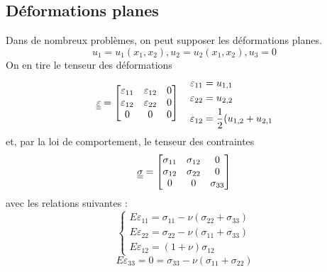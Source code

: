 \subsection{Déformations planes}\label{ssec:Ch08-1.1}
Dans de nombreux problèmes, on peut supposer les déformations planes.
\begin{equation}
    u_1=u_1(x_1,x_2), u_2=u_2(x_1,x_2), u_3=0
    \label{eq:Ch08-001}
\end{equation}
On en tire le tenseur des déformations 
\begin{equation}
    \underline{\underline{\varepsilon}}=
    \begin{bmatrix}
        \varepsilon_{11} & \varepsilon_{12} & 0 \\
        \varepsilon_{12} & \varepsilon_{22} & 0 \\
        0                & 0                & 0 \\     
    \end{bmatrix}
    \quad
    \begin{aligned}
         \varepsilon_{11}&= u_{1,1} \\
         \varepsilon_{22}&= u_{2,2} \\
         \varepsilon_{12}&= \frac{1}{2}(u_{1,2}+u_{2,1} 
    \end{aligned}
\label{eq:Ch08-002}
\end{equation}
et, par la loi de comportement, le tenseur des contraintes
\begin{equation}
    \underline{\underline{\sigma}} =
    \begin{bmatrix}
        \sigma_{11} & \sigma_{12} & 0           \\
        \sigma_{12} & \sigma_{22} & 0           \\
        0           & 0           & \sigma_{33} \\     
    \end{bmatrix}
\label{eq:Ch08-003}
\end{equation}
avec les relations suivantes :
\begin{equation}
   \begin{cases}
     E\varepsilon_{11} = \sigma_{11}-\nu(\sigma_{22}+\sigma_{33}) \\
     E\varepsilon_{22} = \sigma_{22}-\nu(\sigma_{11}+\sigma_{33}) \\
     E\varepsilon_{12} = (1+\nu)\sigma_{12}
   \end{cases}
    \label{eq:Ch08-004}
\end{equation}
\begin{equation}
     E\varepsilon_{33} = 0 = \sigma_{33}-\nu(\sigma_{11}+\sigma_{22})
    \label{eq:Ch08-005}
\end{equation}
